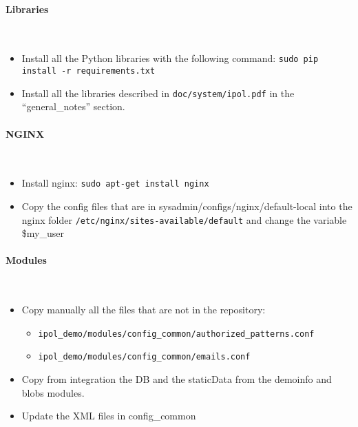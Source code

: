 \paragraph{Libraries} \hspace{0pt} \\
\begin{itemize}
    \item Install all the Python libraries with the following command: {\tt sudo pip install -r requirements.txt}
    \item Install all the libraries described in {\tt doc/system/ipol.pdf} in the ``general\_notes'' section.
\end{itemize}

\paragraph{NGINX} \hspace{0pt} \\
\begin{itemize}
    \item Install nginx: {\tt sudo apt-get install nginx}
    \item Copy the config files that are in sysadmin/configs/nginx/default-local into the nginx folder {\tt/etc/nginx/sites-available/default} and change the variable \$my\_user
\end{itemize}

\paragraph{Modules} \hspace{0pt} \\
\begin{itemize}
    \item Copy manually all the files that are not in the repository:
    \begin{itemize}
        \item {\tt ipol\_demo/modules/config\_common/authorized\_patterns.conf}
        \item {\tt ipol\_demo/modules/config\_common/emails.conf}
    \end{itemize}
    \item Copy from integration the DB and the staticData from the demoinfo and blobs modules.
    \item Update the XML files in config\_common
\end{itemize}

